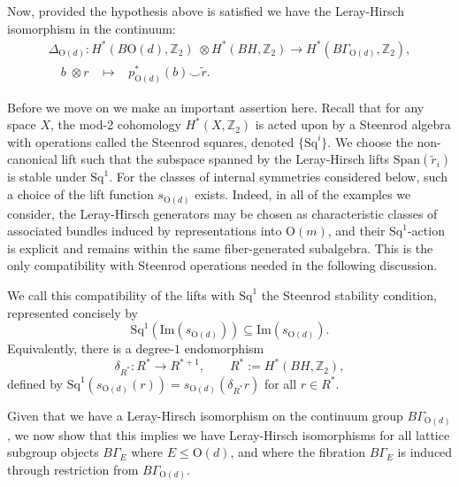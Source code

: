 \documentclass[aps,prx,reprint,superscriptaddress,twocolumn,amsmath,amssymb,amsfonts, nofootinbib]{revtex4-2}
\newcommand{\Z}{\mathbb{Z}}
\theoremstyle{apsstyle}
\begin{document}
\bigskip 

\noindent Now, provided the hypothesis above is satisfied we have the Leray-Hirsch isomorphism in the continuum:
\begin{gather}
\nonumber
    \Delta_{\mathrm{O}(d)}: H^{*}(B\mathrm{O}(d), \Z_{2})\;\otimes  H^{*}(BH, \Z_{2}) \rightarrow H^{*}(B\Gamma_{\mathrm{O}(d)}, \Z_{2}),\\
    \quad b\;\otimes r \;\;\;\longmapsto \;\;\;p_{\mathrm{O}(d)}^{*}(b)\smile \widetilde{r}.\label{eq:internal_continuum_mod2}
\end{gather}

\medskip

\noindent Before we move on we make an important assertion here. Recall that for any space $X$, the mod-2 cohomology $H^{*}(X,\Z_{2})$ is acted upon by a Steenrod algebra with operations called the Steenrod squares, denoted $\{\mathrm{Sq}^{i}\}$. We choose the non-canonical lift such that the subspace spanned by the Leray-Hirsch lifts $\mathrm{Span}(\widetilde{r}_{i})$ is stable under $\mathrm{Sq}^{1}$. For the classes of internal symmetries considered below, such a choice of the lift function $s_{\mathrm{O}(d)}$ exists. Indeed, in all of the examples we consider, the Leray-Hirsch generators may be chosen as characteristic classes of associated bundles induced by representations into $\mathrm{O}(m)$, and their $\mathrm{Sq}^{1}$-action is explicit and remains within the same fiber-generated subalgebra. This is the only compatibility with Steenrod operations needed in the following discussion.

\bigskip 

\noindent \noindent We call this compatibility of the lifts with $\mathrm{Sq}^{1}$ the Steenrod stability condition, represented concisely by
\begin{equation}
\label{eq:Steenrod_stability_cont}
    \mathrm{Sq}^{1}\left(\mathrm{Im}(s_{\mathrm{O}(d)})\right) \subseteq \mathrm{Im}(s_{\mathrm{O}(d)}).
\end{equation}
Equivalently, there is a degree-$1$ endomorphism
\begin{equation}
\label{eq:delta_cont}
    \delta_{R^*}:R^*\to R^{*+1},
\qquad R^*:=H^*(BH,\mathbb Z_2),
\end{equation}
defined by $\mathrm{Sq}^1(s_{\mathrm{O}(d)}(r))=s_{\mathrm{O}(d)}(\delta_{R^*}r)$ for all $r\in R^*$.

\bigskip 

Given that we have a Leray-Hirsch isomorphism on the continuum group $B\Gamma_{\mathrm{O}(d)}$, we now show that this implies we have Leray-Hirsch isomorphisms for all lattice subgroup objects $B\Gamma_{E}$ where $E\leq \mathrm{O}(d)$, and where the fibration $B\Gamma_{E}$ is induced through restriction from $B\Gamma_{\mathrm{O}(d)}$. 
\end{document}
